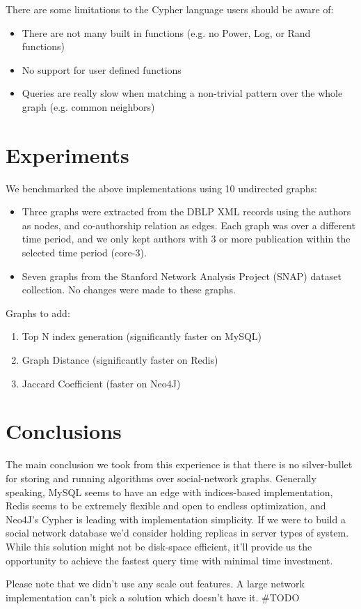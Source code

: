 There are some limitations to the Cypher language users should be aware of:
\begin{itemize}
\item There are not many built in functions (e.g. no Power, Log, or Rand
  functions) 
\item No support for user defined functions
\item Queries are really slow when matching a non-trivial pattern over the whole
graph (e.g. common neighbors)  
\end{itemize}

\section{Experiments}
We benchmarked the above implementations using 10 undirected graphs:
\begin{itemize}
\item Three graphs were extracted from the DBLP XML records using the authors as
nodes, and co-authorship relation as edges. Each graph was over a different
time period, and  we only kept authors with 3 or more publication within the
selected time period (core-3). 

\item Seven graphs from the Stanford Network Analysis Project (SNAP) dataset
  collection. No changes were made to these graphs.
\end{itemize}

Graphs to add:
\begin{enumerate}
\item Top N index generation (significantly faster on MySQL)
\item Graph Distance (significantly faster on Redis)
\item Jaccard Coefficient (faster on Neo4J)
\end{enumerate}

\section{Conclusions}
The main conclusion we took from this experience is that there is no silver-bullet for storing and running algorithms over social-network graphs. Generally speaking, MySQL seems to have an edge with indices-based implementation, Redis seems to be extremely flexible and open to endless optimization, and Neo4J's Cypher is leading with implementation simplicity.
If we were to build a social network database we'd consider holding replicas in server types of system. While this solution might not be disk-space efficient, it'll provide us the opportunity to achieve the fastest query time with minimal time investment.

Please note that we didn't use any scale out features. A large network implementation can't pick a solution which doesn't have it. \#TODO
